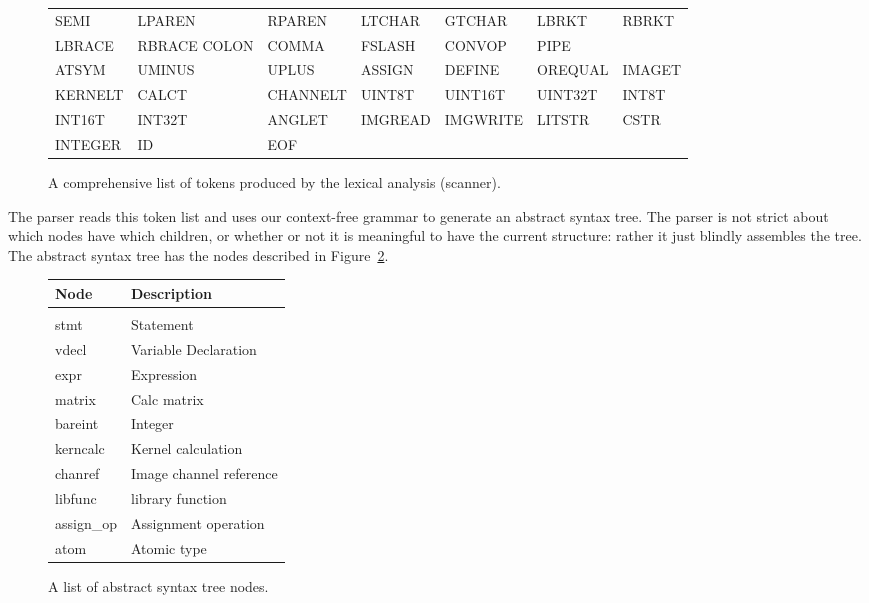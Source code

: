 \begin{figure}[h]
\begin{center}
\begin{tabular}{l l l l l l l}

    SEMI & LPAREN & RPAREN & LTCHAR & GTCHAR & LBRKT & RBRKT \\
    LBRACE & RBRACE COLON & COMMA & FSLASH & CONVOP & PIPE \\
    ATSYM & UMINUS & UPLUS & ASSIGN & DEFINE & OREQUAL & IMAGET \\
    KERNELT & CALCT & CHANNELT & UINT8T & UINT16T & UINT32T & INT8T \\
    INT16T & INT32T & ANGLET & IMGREAD & IMGWRITE & LITSTR & CSTR \\
    INTEGER & ID & EOF \\

\end{tabular}
\caption{A comprehensive list of tokens produced by the lexical analysis
(scanner).}
\end{center}
\label{fig:tokens}
\end{figure}

The parser reads this token list and uses our context-free grammar to generate
an abstract syntax tree. The parser is not strict about which nodes have
which children, or whether or not it is meaningful to have the current
structure: rather it just blindly assembles the tree. The abstract syntax tree
has the nodes described in Figure~\ref{fig:astnodes}.

\begin{figure}
\begin{center}
\begin{tabular}{l | l}
{\bf Node} & {\bf Description} \\
\hline \\
stmt & Statement \\
vdecl & Variable Declaration \\
expr & Expression \\
matrix & Calc matrix \\
bareint & Integer \\
kerncalc & Kernel calculation \\
chanref & Image channel reference \\
libfunc & \sys{} library function \\
assign\_op & Assignment operation \\
atom & Atomic type
\end{tabular}
\caption{A list of abstract syntax tree nodes.}
\label{fig:astnodes}
\end{center}
\end{figure}

